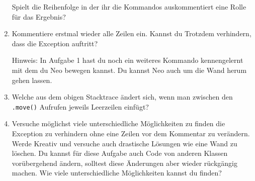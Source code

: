\begin{enumerate}[label=\alph*)]
        Spielt die Reihenfolge in der ihr die Kommandos auskommentiert eine Rolle für das Ergebnis?
    \item Kommentiere erstmal wieder alle Zeilen ein.
        Kannst du Trotzdem verhindern, dass die Exception auftritt?

        Hinweis: In Aufgabe 1 hast du noch ein weiteres Kommando kennengelernt mit dem du Neo bewegen kannst.
        Du kannst Neo auch um die Wand herum gehen lassen.
    \item \optional Welche  aus dem obigen Stacktrace ändert sich, wenn man zwischen den \lstinline{.move()} Aufrufen jeweils Leerzeilen einfügt?
    \item \optional Versuche möglichst viele unterschiedliche Möglichkeiten zu finden die Exception zu verhindern ohne eine Zeilen vor dem Kommentar zu verändern.
        Werde Kreativ und versuche auch drastische Lösungen wie eine Wand zu löschen.
        Du kannst für diese Aufgabe auch Code von anderen Klassen vorübergehend ändern, solltest diese Änderungen aber wieder rückgängig machen.
        Wie viele unterschiedliche Möglichkeiten kannst du finden?
\end{enumerate}
 
